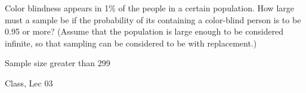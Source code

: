 \begin{samepage}
\begin{ex}
Color blindness appears in 1\%  of the people in a certain population. How large must a sample be if the probability of its containing a color-blind person is to be 0.95 or more? (Assume that the population is large enough to be considered infinite, so that sampling can be considered to be with replacement.)
\end{ex}
\begin{ans}
Sample size greater than 299
\end{ans}
\begin{source}
Class, Lec 03
\end{source}
\end{samepage}
